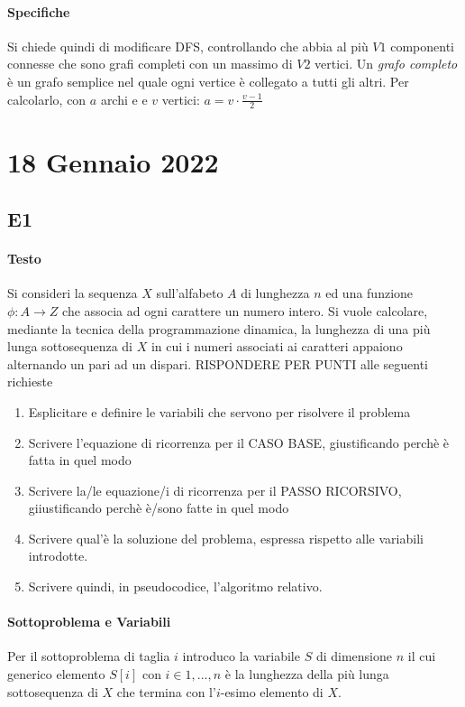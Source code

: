 \documentclass[12pt, a4paper, openany]{book}
\begin{document}
\paragraph*{Specifiche}
Si chiede quindi di modificare DFS, controllando che abbia al più $V1$ componenti connesse che sono grafi completi con un massimo di $V2$ vertici.
Un \emph{grafo completo} è un grafo semplice nel quale ogni vertice è collegato a tutti gli altri. Per calcolarlo, con $a$ archi e e $v$ vertici: $a = v\cdot \frac{v-1}{2}$
\section{18 Gennaio 2022}
\subsection{E1}
\paragraph*{Testo}
Si consideri la sequenza $X$ sull'alfabeto $A$ di lunghezza $n$ ed una funzione $\phi:A\to Z$ che associa ad ogni carattere un numero intero.
Si vuole calcolare, mediante la tecnica della programmazione dinamica, la lunghezza di una più lunga sottosequenza di $X$ in cui i numeri associati ai caratteri appaiono alternando un pari ad un dispari.
RISPONDERE PER PUNTI alle seguenti richieste
\begin{enumerate}
	\item Esplicitare e definire le variabili che servono per risolvere il problema
	\item Scrivere l'equazione di ricorrenza per il CASO BASE, giustificando perchè è fatta in quel modo
	\item Scrivere la/le equazione/i di ricorrenza per il PASSO RICORSIVO, giiustificando perchè è/sono fatte in quel modo
	\item Scrivere qual'è la soluzione del problema, espressa rispetto alle variabili introdotte.
	\item Scrivere quindi, in pseudocodice, l'algoritmo relativo.
\end{enumerate}

\paragraph*{Sottoproblema e Variabili}
Per il sottoproblema di taglia $i$ introduco la variabile $S$ di dimensione $n$ il cui generico elemento
$S[i]$ con $i\in {1,...,n}$ è la lunghezza della più lunga sottosequenza di $X$ che termina con l'$i$-esimo elemento di $X$.
\end{document}
